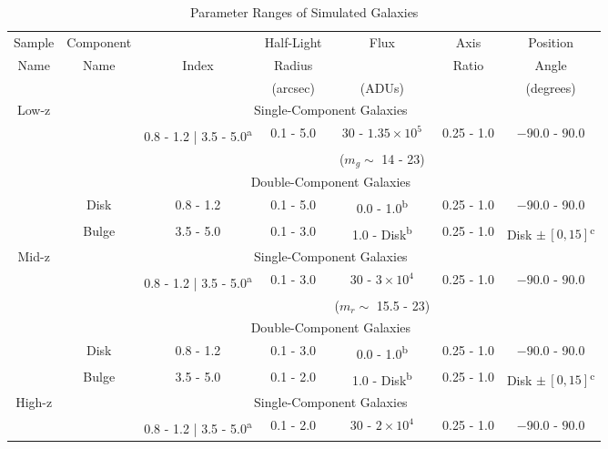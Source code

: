     \begin{table}[htbp]
    \centering
    \caption{Parameter Ranges of Simulated Galaxies  \label{tab_c3:sim_para}}
    \hline
    \hline
    \begin{tabular}{c|cccccc}
    Sample & Component & \sersic{} & Half-Light & Flux & Axis & Position\\
    Name & Name & Index & Radius & & Ratio & Angle \\
    & & & (arcsec) & (ADUs) & & (degrees) \\
    \hline
        \hline
        \multirow{5}{*}{Low-z} & \multicolumn{6}{c}{Single-Component Galaxies} \\
        & & 0.8 - 1.2 | 3.5 - 5.0\textsuperscript{a} & 0.1 - 5.0 & 30 - $1.35\times10^5$ & 0.25 - 1.0 & $-90.0$ - $90.0$ \\
        & & & & ($m_g \sim $ 14 - 23) & & \\
        \cline{2-7}
        & \multicolumn{6}{c}{Double-Component Galaxies} \\
        & Disk & 0.8 - 1.2 & 0.1 - 5.0 & 0.0 - 1.0\textsuperscript{b} & 0.25 - 1.0 & $-90.0$ - 90.0\\
        & Bulge & 3.5 - 5.0 & 0.1 - 3.0 & 1.0 - Disk\textsuperscript{b} & 0.25 - 1.0 &  Disk $\pm\,[0,15]$\textsuperscript{c} \\
        \hline
        \hline
        \multirow{5}{*}{Mid-z} & \multicolumn{6}{c}{Single-Component Galaxies} \\
        & & 0.8 - 1.2 | 3.5 - 5.0\textsuperscript{a} & 0.1 - 3.0 & 30 - $3\times10^4$ & 0.25 - 1.0 & $-90.0$ - $90.0$ \\
        & & & & ($m_r \sim $ 15.5 - 23) & & \\
        \cline{2-7}
        & \multicolumn{6}{c}{Double-Component Galaxies} \\
        & Disk & 0.8 - 1.2 & 0.1 - 3.0 & 0.0 - 1.0\textsuperscript{b} & 0.25 - 1.0 & $-90.0$ - 90.0\\
        & Bulge & 3.5 - 5.0 & 0.1 - 2.0 & 1.0 - Disk\textsuperscript{b} & 0.25 - 1.0 &  Disk $\pm\,[0,15]$\textsuperscript{c} \\
        \hline
        \hline
        \multirow{5}{*}{High-z} & \multicolumn{6}{c}{Single-Component Galaxies} \\
        & & 0.8 - 1.2 | 3.5 - 5.0\textsuperscript{a} & 0.1 - 2.0 & 30 - $2\times10^4$ & 0.25 - 1.0 & $-90.0$ - $90.0$ \\

\end{tabular}
\end{table}
